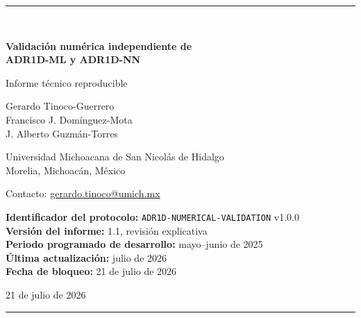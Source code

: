 \documentclass[11pt,a4paper]{article}
\newcommand{\code}[1]{\texttt{#1}}
\begin{document}
\begin{titlepage}
\centering
\vspace*{2.2cm}
{\color{adrblue}\rule{\textwidth}{1.2pt}}\\[1.1cm]
{\Huge\bfseries Validación numérica independiente de\\[0.25cm]
ADR1D-ML y ADR1D-NN\par}
\vspace{0.65cm}
{\Large Informe técnico reproducible\par}
\vspace{1.1cm}
{\large
Gerardo Tinoco-Guerrero\\[0.15cm]
Francisco J. Domínguez-Mota\\[0.15cm]
J. Alberto Guzmán-Torres\par}
\vspace{0.65cm}
{\normalsize
Universidad Michoacana de San Nicolás de Hidalgo\\
Morelia, Michoacán, México\par}
\vspace{0.25cm}
{\normalsize Contacto: \href{mailto:gerardo.tinoco@umich.mx}{gerardo.tinoco@umich.mx}\par}
\vfill
\begin{minipage}{0.88\textwidth}
\small
\textbf{Identificador del protocolo:} \code{ADR1D-NUMERICAL-VALIDATION} v1.0.0\\
\textbf{Versión del informe:} 1.1, revisión explicativa\\
\textbf{Periodo programado de desarrollo:} mayo--junio de 2025\\
\textbf{Última actualización:} julio de 2026\\
\textbf{Fecha de bloqueo:} 21 de julio de 2026
\end{minipage}
\vfill
{\normalsize 21 de julio de 2026\par}
\vspace{0.5cm}
{\color{adrblue}\rule{\textwidth}{1.2pt}}
\end{titlepage}
\end{document}

